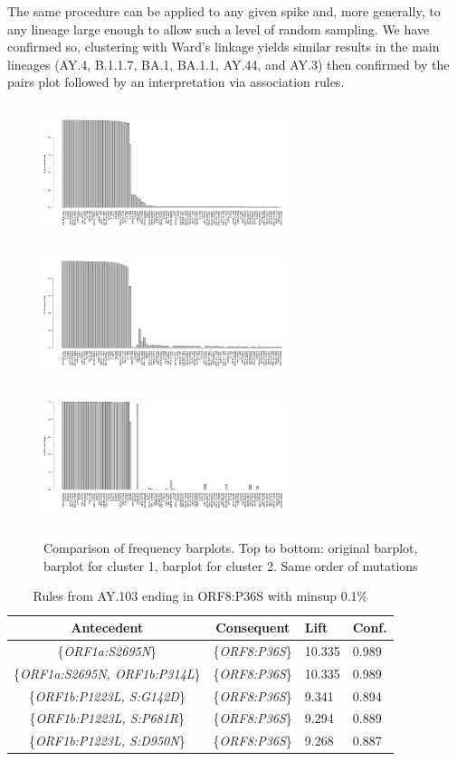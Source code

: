 \documentclass[twoside,twocolumn]{article}
\begin{document}
The same procedure can be applied to any given spike and, more generally, to any lineage large enough to allow such a level of random sampling. We have confirmed so, clustering with Ward's linkage yields similar results in the main lineages (AY.4, B.1.1.7, BA.1, BA.1.1, AY.44, and AY.3) then confirmed by the pairs plot followed by an interpretation via association rules. 
\begin{figure}[h]
	\caption{Comparison of frequency barplots. Top to bottom: original barplot, barplot for cluster 1, barplot for cluster 2. Same order of mutations}
	\label{comparison}
	\centering
	\includegraphics[width=70mm, height=40mm]{c0.png}
	\includegraphics[width=70mm, height=40mm]{c1.png}
	\includegraphics[width=70mm, height=40mm]{c2.png}
\end{figure}
\begin{table}[htb]
	\caption{Rules from AY.103 ending in ORF8:P36S with minsup 0.1\%}
	\label{table:1}
	\renewcommand{\tabcolsep}{2pc} %
	\renewcommand{\arraystretch}{1.5} %
	\begin{tabularx}{\linewidth}{| c | c | X | X |}
		\hline
		Antecedent & Consequent & Lift & Conf. \\
		\hline
		\{\textit{ORF1a:S2695N}\} & \{\textit{ORF8:P36S}\}  & 10.335 & 0.989\\
		\{\textit{ORF1a:S2695N, ORF1b:P314L}\} & \{\textit{ORF8:P36S}\} & 10.335 & 0.989\\
		\{\textit{ORF1b:P1223L, S:G142D}\} & \{\textit{ORF8:P36S}\} & 9.341 & 0.894\\
		\{\textit{ORF1b:P1223L, S:P681R}\} & \{\textit{ORF8:P36S}\} & 9.294 & 0.889\\
		\{\textit{ORF1b:P1223L, S:D950N}\} & \{\textit{ORF8:P36S}\} & 9.268 & 0.887\\
		\hline
	\end{tabularx}\\[4pt]
\end{table}
\end{document}
